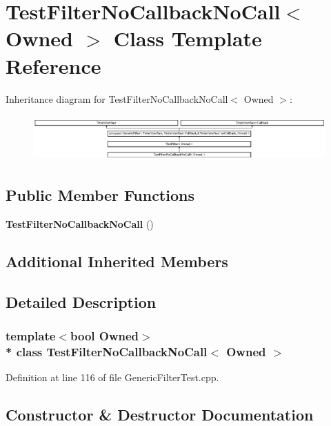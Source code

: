 \section{Test\+Filter\+No\+Callback\+No\+Call$<$ Owned $>$ Class Template Reference}
\label{classTestFilterNoCallbackNoCall}
Inheritance diagram for Test\+Filter\+No\+Callback\+No\+Call$<$ Owned $>$\+:\begin{figure}[H]
\begin{center}
\leavevmode
\includegraphics[height=1.780604cm]{classTestFilterNoCallbackNoCall}
\end{center}
\end{figure}
\subsection*{Public Member Functions}
\begin{DoxyCompactItemize}
\item 
{\bf Test\+Filter\+No\+Callback\+No\+Call} ()
\end{DoxyCompactItemize}
\subsection*{Additional Inherited Members}


\subsection{Detailed Description}
\subsubsection*{template$<$bool Owned$>$\\*
class Test\+Filter\+No\+Callback\+No\+Call$<$ Owned $>$}



Definition at line 116 of file Generic\+Filter\+Test.\+cpp.



\subsection{Constructor \& Destructor Documentation}
